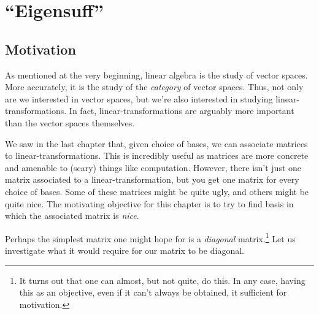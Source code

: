\chapter{``Eigensuff''}

\section{Motivation}\label{sct4.1}

As mentioned at the very beginning, linear algebra is the study of vector spaces.  More accurately, it is the study of the \emph{category} of vector spaces.  Thus, not only are we interested in vector spaces, but we're also interested in studying linear-transformations.  In fact, linear-transformations are arguably more important than the vector spaces themselves.

We saw in the last chapter that, given choice of bases, we can associate matrices to linear-transformations.  This is incredibly useful as matrices are more concrete and amenable to (scary) things like computation.  However, there isn't just one matrix associated to a linear-transformation, but you get one matrix for every choice of bases.  Some of these matrices might be quite ugly, and others might be quite nice.  The motivating objective for this chapter is to try to find basis in which the associated matrix is \emph{nice}.

Perhaps the simplest matrix one might hope for is a \emph{diagonal} matrix.\footnote{It turns out that one can almost, but not quite, do this.  In any case, having this as an objective, even if it can't always be obtained, it sufficient for motivation.}  Let us investigate what it would require for our matrix to be diagonal.

